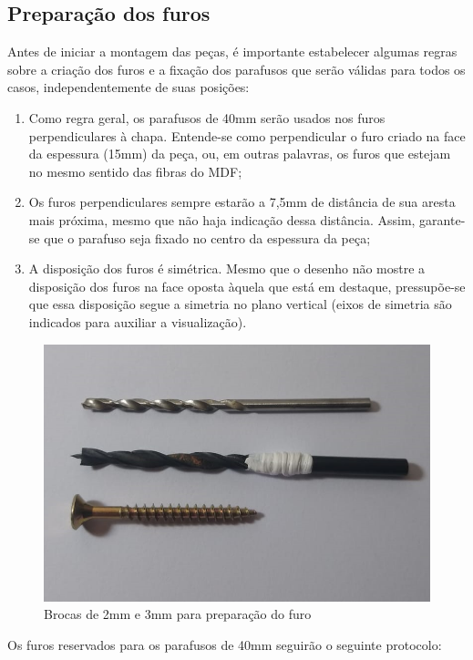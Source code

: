 \subsection{Preparação dos furos}

   \par Antes de iniciar a montagem das peças, é importante estabelecer algumas regras sobre a criação dos furos e a fixação dos parafusos que serão válidas para todos os casos, independentemente de suas posições:
    \begin{enumerate}
        \item Como regra geral, os parafusos de 40mm serão usados nos furos perpendiculares à chapa. Entende-se como perpendicular o furo criado na face da espessura (15mm) da peça, ou, em outras palavras, os furos que estejam no mesmo sentido das fibras do MDF;
        \item Os furos perpendiculares sempre estarão a 7,5mm de distância de sua aresta mais próxima, mesmo que não haja indicação dessa distância. Assim, garante-se que o parafuso seja fixado no centro da espessura da peça;
        \item A disposição dos furos é simétrica. Mesmo que o desenho não mostre a disposição dos furos na face oposta àquela que está em destaque, pressupõe-se que essa disposição segue a simetria no plano vertical (eixos de simetria são indicados para auxiliar a visualização).
        
\end{enumerate}
  
  \begin{figure} [H]
    \centering
    \includegraphics[width=.7\textwidth]{Figuras/montagemMaletasEstrutura/brocas.png}
    \caption{Brocas de 2mm e 3mm para preparação do furo}
    \label{fig:brocas}
\end{figure}
  
\par Os furos reservados para os parafusos de 40mm seguirão o seguinte protocolo:

